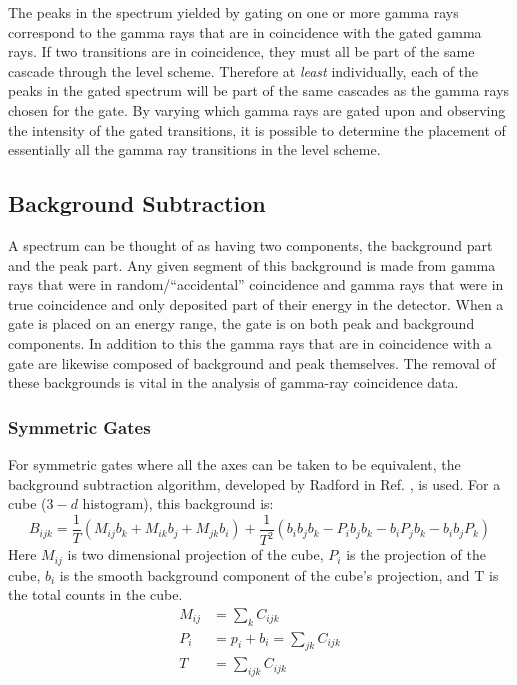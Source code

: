 The peaks in the spectrum yielded by gating on one or more gamma rays correspond to the gamma rays that are in coincidence with the gated gamma rays. If two transitions are in coincidence, they must all be part of the same cascade through the level scheme. Therefore at \emph{least} individually, each of the peaks in the gated spectrum will be part of the same cascades as the gamma rays chosen for the gate. By varying which gamma rays are gated upon and observing the intensity of the gated transitions, it is possible to determine the placement of essentially all the gamma ray transitions in the level scheme.

\subsection{Background Subtraction}
\label{ssec:exp-pr-data-proc-bg-sub}
A spectrum can be thought of as having two components, the background part and the peak part. Any given segment of this background is made from gamma rays that were in random/``accidental'' coincidence and gamma rays that were in true coincidence and only deposited part of their energy in the detector. When a gate is placed on an energy range, the gate is on both peak and background components. In addition to this the gamma rays that are in coincidence with a gate are likewise composed of background and peak themselves. The removal of these backgrounds is vital in the analysis of gamma-ray coincidence data.

\subsubsection{Symmetric Gates}
\label{sssec:exp-pr-data-proc-bg-sub-sym}
For symmetric gates where all the axes can be taken to be equivalent, the background subtraction algorithm, developed by Radford in Ref. \cite{symBGSub}, is used. For a cube ($3-d$ histogram), this background is:
\begin{equation}
\label{eqn:chp3-cube-bg}
B_{ijk}=\frac{1}{T}\left(M_{ij}b_{k} + M_{ik}b_{j} + M_{jk}b_{i}\right) + \frac{1}{T^{2}}\left(b_{i}b_{j}b_{k} - P_{i}b_{j}b_{k} - b_{i}P_{j}b_{k} - b_{i}b_{j}P_{k}\right)
\end{equation} 
Here $M_{ij}$ is two dimensional projection of the cube, $P_{i}$ is the projection of the cube, $b_{i}$ is the smooth background component of the cube's projection, and T is the total counts in the cube.
\begin{align}
\label{eqn:chp3-cube-bg-defs}
M_{ij} &= \sum\limits_{k}^{}C_{ijk} \\
P_i &= p_i + b_i = \sum\limits_{jk}^{}C_{ijk}\\
T &= \sum\limits_{ijk}^{}C_{ijk}
\end{align}

